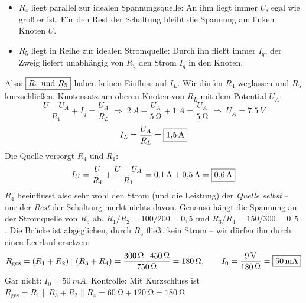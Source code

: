 \documentclass[11pt,a4paper]{article}
\begin{document}
\begin{loesung}
\begin{itemize}[nosep]
  \item $R_4$ liegt parallel zur idealen Spannungsquelle: An ihm liegt immer $U$, egal wie groß er ist. Für den Rest der Schaltung bleibt die Spannung am linken Knoten $U$.
  \item $R_5$ liegt in Reihe zur idealen Stromquelle: Durch ihn fließt immer $I_q$, der Zweig liefert unabhängig von $R_5$ den Strom $I_q$ in den Knoten.
\end{itemize}
Also: $\boxed{R_4 \text{ und } R_5}$ haben keinen Einfluss auf $I_L$. Wir dürfen $R_4$ weglassen und $R_5$ kurzschließen.
Knotensatz am oberen Knoten von $R_L$ mit dem Potential $U_A$:
\[
  \frac{U-U_A}{R_1} + I_q = \frac{U_A}{R_L}
  \;\Rightarrow\; \SI{2}{A} - \frac{U_A}{\SI{5}{\ohm}} + \SI{1}{A} = \frac{U_A}{\SI{5}{\ohm}}
  \;\Rightarrow\; U_A = \SI{7.5}{V}
\]
\[
  I_L = \frac{U_A}{R_L} = \boxed{\SI{1.5}{A}}
\]
Die Quelle versorgt $R_4$ und $R_1$:
\[
  I_U = \frac{U}{R_4} + \frac{U-U_A}{R_1} = \SI{0.1}{A} + \SI{0.5}{A} = \boxed{\SI{0.6}{A}}
\]
$R_4$ beeinflusst also sehr wohl den Strom (und die Leistung) der \emph{Quelle selbst} -- nur der \emph{Rest} der Schaltung merkt nichts davon. Genauso hängt die Spannung an der Stromquelle von $R_5$ ab.
$R_1/R_2 = 100/200 = 0{,}5$ und $R_3/R_4 = 150/300 = 0{,}5$ \checkmark. Die Brücke ist abgeglichen, durch $R_5$ fließt kein Strom -- wir dürfen ihn durch einen Leerlauf ersetzen:
\[
  R_\text{ges} = (R_1+R_2)\,\|\,(R_3+R_4) = \frac{\SI{300}{\ohm}\cdot\SI{450}{\ohm}}{\SI{750}{\ohm}} = \SI{180}{\ohm},
  \qquad I_0 = \frac{\SI{9}{V}}{\SI{180}{\ohm}} = \boxed{\SI{50}{mA}}
\]
Gar nicht: $I_0 = \SI{50}{mA}$. Kontrolle: Mit Kurzschluss ist $R_\text{ges} = R_1\|R_3 + R_2\|R_4 = \SI{60}{\ohm} + \SI{120}{\ohm} = \SI{180}{\ohm}$ \checkmark
{}
\end{loesung}
\end{document}

